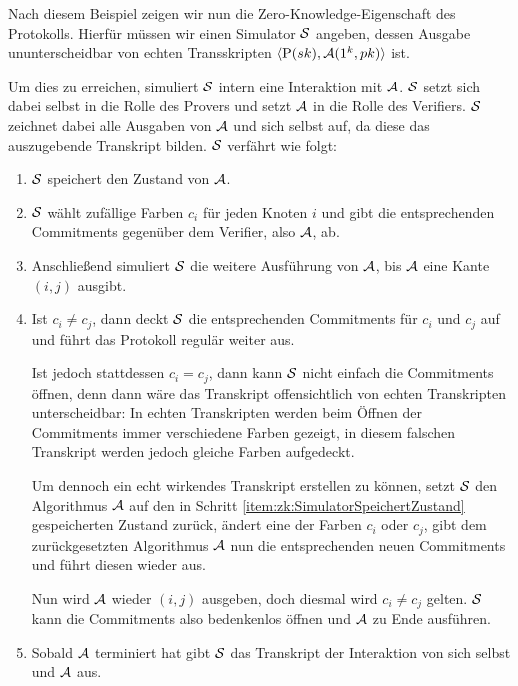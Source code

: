 Nach diesem Beispiel zeigen wir nun die Zero-Knowledge-Eigenschaft des Protokolls.
Hierfür müssen wir einen Simulator $\mathcal{S}$ angeben, dessen Ausgabe ununterscheidbar von echten Transskripten $\langle \mathrm{P}(sk), \mathcal{A}(1^k, pk) \rangle$ ist.

Um dies zu erreichen, simuliert $\mathcal{S}$ intern eine Interaktion mit $\mathcal{A}$. $\mathcal{S}$ setzt sich dabei selbst in die Rolle des Provers und setzt $\mathcal{A}$ in die Rolle des Verifiers. $\mathcal{S}$ zeichnet dabei alle Ausgaben von $\mathcal{A}$ und sich selbst auf, da diese das auszugebende Transkript bilden.
$\mathcal{S}$ verfährt wie folgt:
\begin{enumerate}
	\item \label{item:zk:SimulatorSpeichertZustand}
	$\mathcal{S}$ speichert den Zustand von $\mathcal{A}$.
	\item $\mathcal{S}$ wählt zufällige Farben $c_i$ für jeden Knoten $i$ und gibt die entsprechenden Commitments gegenüber dem Verifier, also $\mathcal{A}$, ab.
	\item Anschließend simuliert $\mathcal{S}$ die weitere Ausführung von $\mathcal{A}$, bis $\mathcal{A}$ eine Kante $(i,j)$ ausgibt.
	
	\item Ist $c_i \neq c_j$, dann deckt $\mathcal{S}$ die entsprechenden Commitments für $c_i$ und $c_j$ auf und führt das Protokoll regulär weiter aus.
	
		Ist jedoch stattdessen $c_i = c_j$, dann kann $\mathcal{S}$ nicht einfach die Commitments öffnen, denn dann wäre das Transkript offensichtlich von echten Transkripten unterscheidbar: In echten Transkripten werden beim Öffnen der Commitments immer verschiedene Farben gezeigt, in diesem falschen Transkript werden jedoch gleiche Farben aufgedeckt.
		
		Um dennoch ein echt wirkendes Transkript erstellen zu können, setzt $\mathcal{S}$ den Algorithmus $\mathcal{A}$ auf den in Schritt \ref{item:zk:SimulatorSpeichertZustand} gespeicherten Zustand zurück, ändert eine der Farben $c_i$ oder $c_j$, gibt dem zurückgesetzten Algorithmus $\mathcal{A}$ nun die entsprechenden neuen Commitments und führt diesen wieder aus.
		
		Nun wird $\mathcal{A}$ wieder $(i,j)$ ausgeben, doch diesmal wird $c_i \neq c_j$ gelten. $\mathcal{S}$ kann die Commitments also bedenkenlos öffnen und $\mathcal{A}$ zu Ende ausführen.

			\item Sobald $\mathcal{A}$ terminiert hat gibt $\mathcal{S}$ das Transkript der Interaktion von sich selbst und $\mathcal{A}$ aus.
\end{enumerate}

